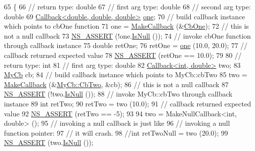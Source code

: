 \begin{DoxyCode}
65 \{
66   \textcolor{comment}{// return type: double}
67   \textcolor{comment}{// first arg type: double}
68   \textcolor{comment}{// second arg type: double}
69   \hyperlink{classns3_1_1Callback}{Callback<double, double, double>} \hyperlink{visualizer-ideas_8txt_a0a84c3fa82a58d60404416317320714e}{one};
70   \textcolor{comment}{// build callback instance which points to cbOne function}
71   one = \hyperlink{group__makecallbackmemptr_ga9376283685aa99d204048d6a4b7610a4}{MakeCallback} (&\hyperlink{main-callback_8cc_a0d0f54ce19e6ffbc7b79325e2fe4d20c}{CbOne});
72   \textcolor{comment}{// this is not a null callback}
73   \hyperlink{assert_8h_a6dccdb0de9b252f60088ce281c49d052}{NS\_ASSERT} (!one.\hyperlink{classns3_1_1Callback_aa8e27826badbf37f84763f36f70d9b54}{IsNull} ());
74   \textcolor{comment}{// invoke cbOne function through callback instance}
75   \textcolor{keywordtype}{double} retOne;
76   retOne = \hyperlink{visualizer-ideas_8txt_a0a84c3fa82a58d60404416317320714e}{one} (10.0, 20.0);
77   \textcolor{comment}{// callback returned expected value}
78   \hyperlink{assert_8h_a6dccdb0de9b252f60088ce281c49d052}{NS\_ASSERT} (retOne == 10.0);
79 
80   \textcolor{comment}{// return type: int}
81   \textcolor{comment}{// first arg type: double}
82   \hyperlink{classns3_1_1Callback}{Callback<int, double>} two;
83   \hyperlink{classMyCb}{MyCb} cb;
84   \textcolor{comment}{// build callback instance which points to MyCb::cbTwo}
85   two = \hyperlink{group__makecallbackmemptr_ga9376283685aa99d204048d6a4b7610a4}{MakeCallback} (&\hyperlink{classMyCb_a1275c65eccffdb561257927cd38c5e8f}{MyCb::CbTwo}, &cb);
86   \textcolor{comment}{// this is not a null callback}
87   \hyperlink{assert_8h_a6dccdb0de9b252f60088ce281c49d052}{NS\_ASSERT} (!two.\hyperlink{classns3_1_1Callback_aa8e27826badbf37f84763f36f70d9b54}{IsNull} ());
88   \textcolor{comment}{// invoke MyCb::cbTwo through callback instance}
89   \textcolor{keywordtype}{int} retTwo;
90   retTwo = two (10.0);
91   \textcolor{comment}{// callback returned expected value}
92   \hyperlink{assert_8h_a6dccdb0de9b252f60088ce281c49d052}{NS\_ASSERT} (retTwo == -5);
93 
94   two = MakeNullCallback<int, double> ();
95   \textcolor{comment}{// invoking a null callback is just like}
96   \textcolor{comment}{// invoking a null function pointer:}
97   \textcolor{comment}{// it will crash.}
98   \textcolor{comment}{//int retTwoNull = two (20.0);}
99   \hyperlink{assert_8h_a6dccdb0de9b252f60088ce281c49d052}{NS\_ASSERT} (two.\hyperlink{classns3_1_1Callback_aa8e27826badbf37f84763f36f70d9b54}{IsNull} ());

\end{DoxyCode}
